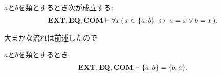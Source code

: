 	\begin{screen}
		\begin{thm}[対は表示されている要素しか持たない]
		\label{thm:pair_members_are_exactly_the_given_two}
			$a$と$b$を類とするとき次が成立する:
			\begin{align}
				\mbox{{\bf EXT}},\mbox{{\bf EQ}},\mbox{\bf COM} \vdash 
				\forall x\, (\, x \in \{a,b\} \hspace{0.25em}\leftrightarrow\hspace{0.25em} a = x \vee b = x\, ).
			\end{align}
		\end{thm}
	\end{screen}
	
	\begin{sketch}
		大まかな流れは前述したので
	\end{sketch}
	
	\begin{screen}
		\begin{thm}[要素の表示の順番を入れ替えても対は等しい]
		\label{thm:commutative_law_of_pairs}
			$a$と$b$を類とするとき
			\begin{align}
				\mbox{{\bf EXT}},\mbox{{\bf EQ}},\mbox{\bf COM} \vdash \{a,b\} = \{b,a\}.
			\end{align}
		\end{thm}
	\end{screen}
	
